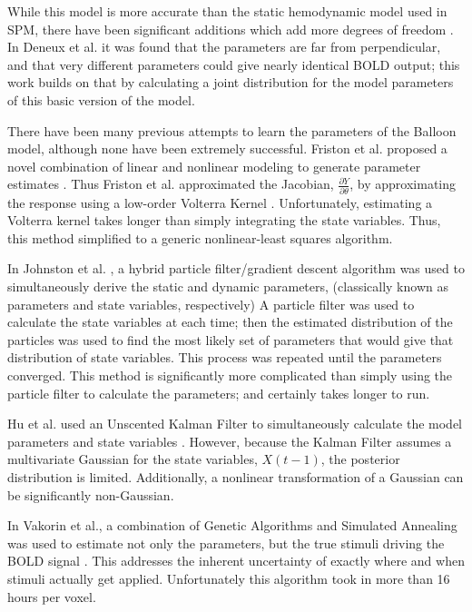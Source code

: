 \documentclass{article}
\begin{document}
While this model is more accurate than the static hemodynamic model used in \ac{SPM},
there have been significant additions which add more degrees of freedom \cite{Deneux2006}. 
In Deneux et al. it was found that the parameters are far from perpendicular,
and that very different parameters could give nearly identical \ac{BOLD} output;
this work builds on that by calculating a joint distribution for the
model parameters of this basic version of the model\cite{Deneux2006}. 

There have been many previous attempts to learn the parameters of the
Balloon model, although none have been extremely successful. 
Friston et al. proposed a novel combination of 
linear and nonlinear modeling to generate parameter estimates
\cite{Friston2002b}.  Thus Friston et al. approximated the Jacobian, 
$\frac{\partial Y}{\partial \theta}$, by approximating the response
using a low-order Volterra Kernel \cite{Friston2002b}. 
Unfortunately, estimating a Volterra kernel
takes longer than simply integrating the state variables. Thus,
this method simplified to a generic nonlinear-least squares algorithm.

In Johnston et al. \cite{Johnston2007}, a hybrid particle filter/gradient
descent algorithm was used to simultaneously derive the static and dynamic 
parameters, (classically known as parameters and state variables, respectively)
A particle filter was used to calculate the state variables at each
time; then the estimated distribution of the particles was used to find
the most likely set of parameters that would give that distribution of state variables.
This process was repeated until the parameters converged. This
method is significantly more complicated than simply using the particle
filter to calculate the parameters; and certainly takes longer to run.

Hu et al. used an Unscented Kalman Filter to simultaneously calculate
the model parameters and state variables \cite{Hu2009}.
However, because the Kalman Filter assumes a multivariate 
Gaussian for the state variables, $X(t-1)$, the posterior 
distribution is limited. Additionally, a nonlinear transformation
of a Gaussian can be significantly non-Gaussian. 

In Vakorin et al., a combination of Genetic Algorithms and 
Simulated Annealing was used to estimate not only the parameters, but the true 
stimuli driving the \ac{BOLD} signal  \cite{Vakorin2007}. 
This addresses the inherent uncertainty of exactly where and when 
stimuli actually get applied. Unfortunately this algorithm took
in more than 16 hours per voxel.
\end{document}
